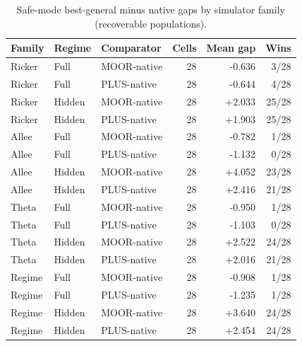 \begin{table}[htbp]
\centering
\caption{Safe-mode best-general minus native gaps by simulator family (recoverable populations).}
\label{tab:family}
\begin{tabular}{lllrrr}
\toprule
Family & Regime & Comparator & Cells & Mean gap & Wins \\
\midrule
Ricker & Full & MOOR-native & 28 & -0.636 & 3/28 \\
Ricker & Full & PLUS-native & 28 & -0.644 & 4/28 \\
Ricker & Hidden & MOOR-native & 28 & +2.033 & 25/28 \\
Ricker & Hidden & PLUS-native & 28 & +1.903 & 25/28 \\
Allee & Full & MOOR-native & 28 & -0.782 & 1/28 \\
Allee & Full & PLUS-native & 28 & -1.132 & 0/28 \\
Allee & Hidden & MOOR-native & 28 & +4.052 & 23/28 \\
Allee & Hidden & PLUS-native & 28 & +2.416 & 21/28 \\
Theta & Full & MOOR-native & 28 & -0.950 & 1/28 \\
Theta & Full & PLUS-native & 28 & -1.103 & 0/28 \\
Theta & Hidden & MOOR-native & 28 & +2.522 & 24/28 \\
Theta & Hidden & PLUS-native & 28 & +2.016 & 21/28 \\
Regime & Full & MOOR-native & 28 & -0.908 & 1/28 \\
Regime & Full & PLUS-native & 28 & -1.235 & 1/28 \\
Regime & Hidden & MOOR-native & 28 & +3.640 & 24/28 \\
Regime & Hidden & PLUS-native & 28 & +2.454 & 24/28 \\
\bottomrule
\end{tabular}
\end{table}
